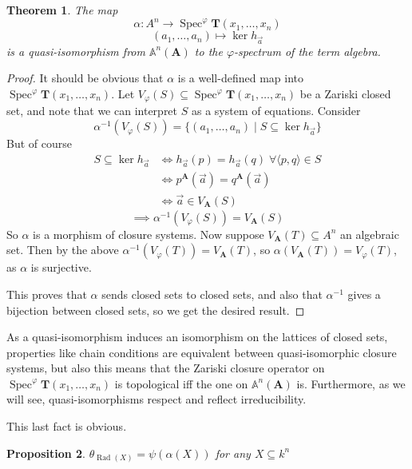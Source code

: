 \documentclass{article}
\theoremstyle{plain}
\newtheorem{theorem}{Theorem}[section]
\newtheorem{proposition}[theorem]{Proposition}
\theoremstyle{definition}
\newcommand{\Spec}{\operatorname{Spec}}
\begin{document}
\begin{theorem}
    The map
    $$\alpha \colon A^n \rightarrow \Spec^\varphi \mathbf{T}(x_1, \dots, x_n)$$
    $$(a_1, \dots, a_n) \mapsto \ker h_{\vec{a}}$$
    is a quasi-isomorphism from $\mathbb{A}^n(\mathbf{A})$ to the $\varphi$-spectrum of the term algebra.
\end{theorem}
\begin{proof}
    It should be obvious that $\alpha$ is a well-defined map into $\Spec^\varphi\mathbf{T}(x_1, \dots, x_n)$.
    Let $V_\varphi(S) \subseteq \Spec^\varphi\mathbf{T}(x_1, \dots, x_n)$ be a Zariski closed set, and note that we can interpret $S$ as a system of equations.
    Consider
    $$\alpha^{-1}(V_\varphi(S)) = \{ (a_1, \dots, a_n) \mid S \subseteq \ker h_{\vec{a}} \}$$
    But of course
    \begin{align*}
        S \subseteq \ker h_{\vec{a}} &\iff h_{\vec{a}}(p) = h_{\vec{a}}(q) \; \forall \langle p, q\rangle \in S\\
        &\iff p^\mathbf{A}(\vec{a}) = q^\mathbf{A}(\vec{a})\\
        &\iff \vec{a} \in V_\mathbf{A}(S)
    \end{align*}
    $$\implies \alpha^{-1}(V_\varphi(S)) = V_\mathbf{A}(S)$$
    So $\alpha$ is a morphism of closure systems.
    Now suppose $V_\mathbf{A}(T) \subseteq A^n$ an algebraic set.
    Then by the above $\alpha^{-1}(V_\varphi(T)) = V_\mathbf{A}(T)$, so $\alpha(V_\mathbf{A}(T)) = V_\varphi(T)$, as $\alpha$ is surjective.\par
    This proves that $\alpha$ sends closed sets to closed sets, and also that $\alpha^{-1}$ gives a bijection between closed sets, so we get the desired result.
\end{proof}

As a quasi-isomorphism induces an isomorphism on the lattices of closed sets, properties like chain conditions are equivalent between quasi-isomorphic closure systems, but also this means that the Zariski closure operator on $\Spec^\varphi \mathbf{T}(x_1, \dots, x_n)$ is topological iff the one on $\mathbb{A}^n(\mathbf{A})$ is.
Furthermore, as we will see, quasi-isomorphisms respect and reflect irreducibility.\par
This last fact is obvious.

\begin{proposition}
    $\theta_{\operatorname{Rad}(X)} = \psi(\alpha(X))$ for any $X\subseteq k^n$
\end{proposition}
\end{document}
